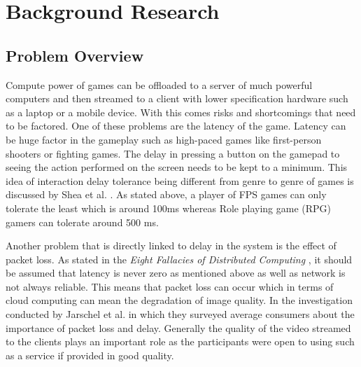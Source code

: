 \chapter{Background Research}
\label{chapter2}

\section{Problem Overview}
Compute power of games can be offloaded to a server of much powerful computers and then streamed to a client with lower specification hardware such as a laptop or a mobile device. With this comes risks and shortcomings that need to be factored. One of these problems are the latency of the game. Latency can be huge factor in the gameplay such as high-paced games like first-person shooters or fighting games. The delay in pressing a button on the gamepad to seeing the action performed on the screen needs to be kept to a minimum. This idea of interaction delay tolerance being different from genre to genre of games is discussed by Shea et al. \cite{shea2013cloud}. As stated above, a player of FPS games can only tolerate the least which is around 100ms whereas Role playing game (RPG) gamers can tolerate around 500 ms.
\newline
\par
Another problem that is directly linked to delay in the system is the effect of packet loss. As stated in the \textit{Eight Fallacies of Distributed Computing} \cite{deutsch1994eight}, it should be assumed that latency is never zero as mentioned above as well as network is not always reliable. This means that packet loss can occur which in terms of cloud computing can mean the degradation of image quality. In the investigation conducted by Jarschel et al. \cite{jarschel2011evaluation} in which they surveyed average consumers about the importance of packet loss and delay. Generally the quality of the video streamed to the clients plays an important role as the participants were open to using such as a service if provided in good quality.


